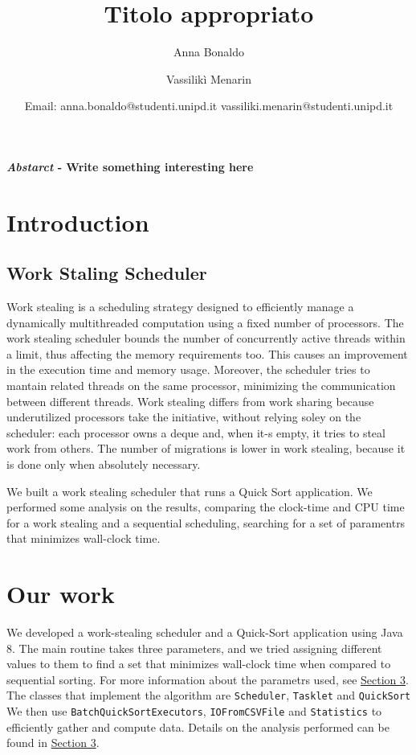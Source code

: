 \documentclass{article}
\title{\LARGE \textbf{Titolo appropriato}}
\author{Anna Bonaldo \and Vassilikì Menarin }
\date{\small {Email: anna.bonaldo@studenti.unipd.it vassiliki.menarin@studenti.unipd.it }}
\def\code#1{\texttt{#1}}
\begin{document}
	

	\maketitle
	
	\textbf{\textit{Abstarct} - Write something interesting here}

	
	\section{Introduction}
	\subsection{Work Staling Scheduler}
	Work stealing is a scheduling strategy designed to efficiently manage a dynamically multithreaded computation using a fixed number of processors. The work stealing scheduler bounds the number of concurrently active threads within a limit, thus affecting the memory requirements too. This causes an improvement in the execution time and memory usage. Moreover, the scheduler tries to mantain related threads on the same processor, minimizing the communication between different threads.
	Work stealing differs from work sharing because underutilized processors take the initiative, without relying soley on the scheduler: each processor owns a deque and, when it-s empty, it tries to steal work from others. The number of migrations is lower in work stealing, because it is done only when absolutely necessary.
	
	We built a work stealing scheduler that runs a Quick Sort application. We performed some analysis on the results, comparing the clock-time and CPU time for a work stealing and a sequential scheduling, searching for a set of paramentrs that minimizes wall-clock time.
	
	\section{Our work}
	We developed a work-stealing scheduler and a Quick-Sort application using Java 8. The main routine takes three parameters, and we tried assigning different values to them to find a set that minimizes wall-clock time when compared to sequential sorting. For more information about the parametrs used, see \href{analysis}{Section 3}. 
	The classes that implement the algorithm are \code{Scheduler}, \code{Tasklet} and \code{QuickSort} We then use \code{BatchQuickSortExecutors}, \code{IOFromCSVFile} and \code{Statistics} to efficiently gather and compute data.
	Details on the analysis performed can be found in \href{analysis}{Section 3}.
	
\end{document}
